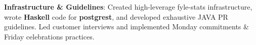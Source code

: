 \documentclass[letterpaper,11pt]{article}
\newcommand{\resumeItem}[2]{
  \item\small{
    \textbf{#1}{: #2 \vspace{-2pt}}
  }
}
\begin{document}
        \resumeItem{Infrastructure \& Guidelines}
            {Created high-leverage fyle-stats infrastructure, wrote \textbf{Haskell} code for \textbf{postgrest}, and developed exhaustive JAVA PR guidelines. Led customer interviews and implemented Monday commitments \& Friday celebrations practices.}
            
\end{document}
